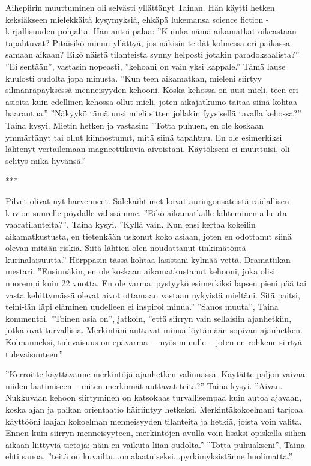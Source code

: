 ﻿\documentclass[a4paper, 12pt, finnish]{article}
\newcommand{\q}[1]{''#1''}  %
\begin{document}
Aihepiirin muuttuminen oli selvästi yllättänyt Tainan.
Hän käytti hetken keksiäkseen mielekkäitä kysymyksiä, ehkäpä
lukemansa science fiction -kirjallisuuden pohjalta. Hän antoi palaa: 
\q{Kuinka nämä aikamatkat oikeastaan tapahtuvat? Pitäisikö minun yllättyä, jos
näkisin teidät kolmessa eri paikassa samaan aikaan? Eikö näistä tilanteista synny
helposti jotakin paradoksaalista?}
\q{Ei sentään}, vastasin nopeasti, \q{kehoani on vain yksi kappale.}
Tämä lause kuulosti oudolta jopa minusta.
\q{Kun teen aikamatkan,
mieleni siirtyy silmänräpäyksessä menneisyyden kehooni. Koska kehossa on
uusi mieli, teen eri asioita kuin edellinen kehossa ollut mieli,
joten aikajatkumo taitaa siinä kohtaa haarautua.}
\q{Näkyykö tämä uusi mieli sitten jollakin fyysisellä tavalla kehossa?} Taina kysyi.
Mietin hetken ja vastasin: \q{Totta puhuen, en ole koskaan ymmärtänyt
tai ollut kiinnostunut, mitä siinä tapahtuu. En ole esimerkiksi
lähtenyt vertailemaan magneettikuvia aivoistani. Käytökseni ei
muuttuisi, oli selitys mikä hyvänsä.}

***

Pilvet olivat nyt harvenneet. Sälekaihtimet loivat auringonsäteistä
raidallisen kuvion suurelle pöydälle välissämme.
\q{Eikö aikamatkalle lähteminen aiheuta vaaratilanteita?}, Taina kysyi.
\q{Kyllä vain. Kun ensi kertaa kokeilin aikamatkustusta, en tietenkään uskonut
koko asiaan, joten en odottanut siinä olevan mitään riskiä. Siitä lähtien
olen noudattanut tinkimätöntä kurinalaisuutta.}
Hörppäsin tässä kohtaa lasistani kylmää vettä. Dramatiikan mestari.
\q{Ensinnäkin, en ole koskaan
aikamatkustanut kehooni, joka olisi nuorempi kuin 22 vuotta.
En ole varma, pystyykö esimerkiksi lapsen pieni pää tai
vasta kehittymässä olevat aivot ottamaan vastaan nykyistä mieltäni.
Sitä paitsi, teini-iän läpi eläminen uudelleen ei inspiroi minua.}
\q{Sanos muuta}, Taina kommentoi.
\q{Toinen asia on}, jatkoin, \q{että siirryn vain sellaisiin
ajanhetkiin, jotka ovat turvallisia. Merkintäni auttavat minua
löytämään sopivan ajanhetken. Kolmanneksi, tulevaisuus on
epävarma -- myös minulle -- joten
en rohkene siirtyä tulevaisuuteen.} 

\q{Kerroitte käyttävänne merkintöjä ajanhetken valinnassa.
Käytätte paljon vaivaa niiden laatimiseen -- miten merkinnät
auttavat teitä?} Taina kysyi.
\q{Aivan. Nukkuvaan kehoon siirtyminen
on katsokaas turvallisempaa kuin autoa ajavaan, koska ajan ja paikan
orientaatio häiriintyy hetkeksi. Merkintäkokoelmani tarjoaa
käyttööni laajan kokoelman menneisyyden tilanteita
ja hetkiä, joista voin valita.
Ennen kuin siirryn menneisyyteen, merkintöjen avulla voin lisäksi opiskella
siihen aikaan liittyviä tietoja: näin en vaikuta liian oudolta.}
\q{Totta puhuakseni}, Taina ehti sanoa, \q{teitä on
kuvailtu...omalaatuiseksi...pyrkimyksistänne huolimatta.}
\end{document}
